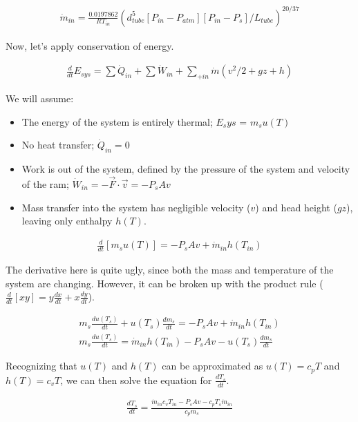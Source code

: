 \documentclass[10pt,letterpaper]{article}
\begin{document}
	\begin{align} \label{eq:sup_mdot}
		\dot{m}_{in} = \frac{0.0197862}{R T_{in}} (d_{tube}^5 [P_{in}-P_{atm}] [P_{in}-P_{s}]/L_{tube})^{20/37}
	\end{align}
	
	Now, let's apply conservation of energy.
	
	\begin{align}
		\frac{d}{dt} E_{sys} = \sum \dot{Q}_{in} + \sum \dot{W}_{in} + \sum_{+in} \dot{m} (v^2/2 + gz + h) \nonumber
	\end{align}
	
	We will assume:
	\begin{itemize}
		\item The energy of the system is entirely thermal; $E_sys$ = $m_s u(T)$
		\item No heat transfer; $\dot{Q}_{in} = 0$
		\item Work is out of the system, defined by the pressure of the system and velocity of the ram; $\dot{W}_{in} = - \vec{F} \cdot \vec{v} = - P_s A v$
		\item Mass transfer into the system has negligible velocity ($v$) and head height ($gz$), leaving only enthalpy $h(T)$.
	\end{itemize}		
	
	\begin{align}
		\frac{d}{dt} [m_s u(T)] = - P_s A v + \dot{m}_{in} h(T_{in}) \nonumber
	\end{align}
	
	The derivative here is quite ugly, since both the mass and temperature of the system are changing. However, it can be broken up with the product rule ($\frac{d}{dt}[xy] = y \frac{dx}{dt} + x \frac{dy}{dt}$).
	
	\begin{align} 
		m_s \frac{d u(T_s)}{dt} + u(T_s) \frac{d m_s}{dt} = - P_s A v + \dot{m}_{in} h(T_{in}) \nonumber \\
		m_s \frac{d u(T_s)}{dt} = \dot{m}_{in} h(T_{in}) - P_s A v - u(T_s) \frac{d m_s}{dt} \nonumber
	\end{align}
	
	Recognizing that $u(T)$ and $h(T)$ can be approximated as $u(T) = c_p T$ and $h(T) = c_v T$, we can then solve the equation for $\frac{dT_s}{dt}$.
	
	\begin{align} \label{eq:ddt_T}
		\frac{d T_s}{dt} = \frac{ \dot{m}_{in} c_v T_{in} - P_s A v - c_p T_s \dot{m}_{in} }{c_p m_s}
	\end{align}
	
\end{document}
